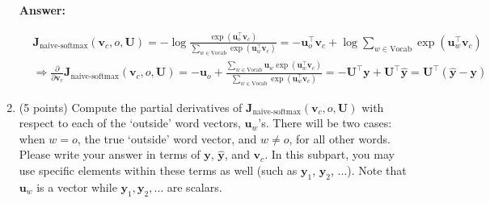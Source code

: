 \documentclass{article}
\newenvironment{answer}{
    {\bf Answer:} \sf \begingroup\color{black}
}{\endgroup}%
\begin{document}
\begin{enumerate}[label=(\alph*)]
          \begin{shaded}
              \begin{answer}
                  \begin{align*}
                       & \bm J_{\text{naive-softmax}}(\bm v_c, o, \bm U)
                      = -\log \frac{\exp(\bm u_{o}^\top \bm v_{c})}{\sum_{w \in \text{Vocab}} \exp(\bm u_{w}^\top \bm v_{c})}
                      = -\bm u_{o}^\top \bm v_{c} + \log \sum_{w \in \text{Vocab}} \exp(\bm u_{w}^\top \bm v_{c})       \\
                       & \Rightarrow \frac{\partial}{\partial \bm v_{c}}\bm J_{\text{naive-softmax}}(\bm v_c, o, \bm U)
                      = -\bm u_{o} + \frac{\sum_{w \in \text{Vocab}} \bm u_{w} \exp(\bm u_{w}^\top \bm v_{c})}{\sum_{w \in \text{Vocab}} \exp(\bm u_{w}^\top \bm v_{c})}
                      = -\bm U^\top \bm y + \bm U^\top \bm \hat{\bm y} = \bm U^\top(\hat{\bm y} - \bm y)
                  \end{align*}
              \end{answer}
          \end{shaded}

    \item (5 points) Compute the partial derivatives of $\bm J_{\text{naive-softmax}}(\bm v_c, o, \bm U)$ with respect to each of the `outside' word vectors, $\bm u_w$'s. There will be two cases: when $w=o$, the true `outside' word vector, and $w \neq o$, for all other words. Please write your answer in terms of $\bm y$, $\hat{\bm y}$, and $\bm v_c$. In this subpart, you may use specific elements within these terms as well (such as $\bm y_1$, $\bm y_2$, $\dots$). Note that $\bm u_w$ is a vector while $\bm y_1, \bm y_2, \dots$ are scalars.


\end{enumerate}
\end{document}
